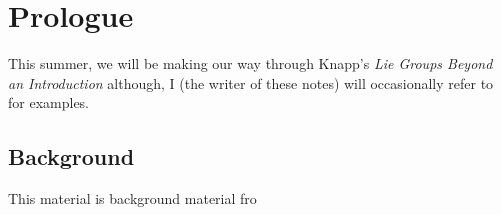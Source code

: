 \chapter{Prologue}
This summer, we will be making our way through Knapp's \emph{Lie Groups
  Beyond an Introduction} \cite{knapp} although, I (the writer of these
notes) will occasionally refer to \cite{hall} for examples.

\section{Background}
This material is background material fro

